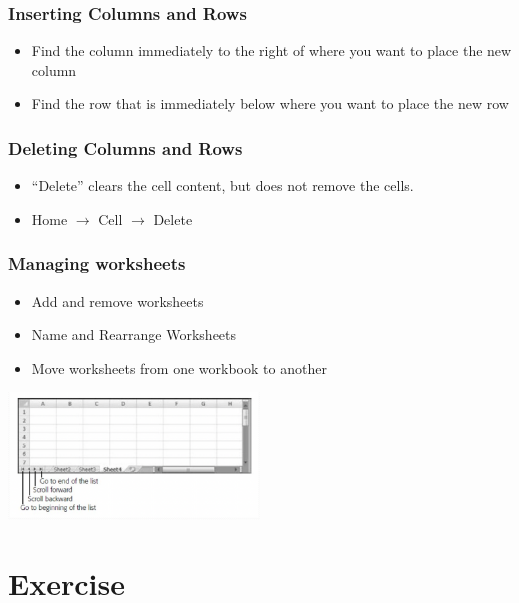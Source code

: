 \documentclass[12pt]{beamer}
\begin{document}
	\begin{frame}
		\frametitle{Inserting Columns and Rows}
		\begin{itemize}
			\item Find the column immediately to the right of where you want to place the new column
			\item Find the row that is immediately below where you want to place the new row
		\end{itemize}
	\end{frame}
	
	\begin{frame}
		\frametitle{Deleting Columns and Rows}
		\begin{itemize}
			\item “Delete” clears the cell content, but does not remove the cells.
			\item Home $\rightarrow$ Cell $\rightarrow$ Delete
		\end{itemize}
	\end{frame}

	\begin{frame}
		\frametitle{Managing worksheets}
		\begin{itemize}
			\item Add and remove worksheets
			\item Name and Rearrange Worksheets
			\item  Move worksheets from one workbook to another
		\end{itemize}
	\begin{center}
		\includegraphics[width=0.5\textwidth]{managingworksheets.png}
	\end{center}
	\end{frame}

\section{Exercise}
\end{document}
